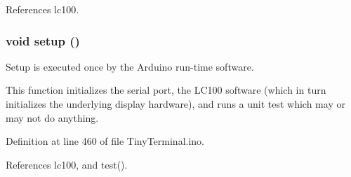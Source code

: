 References lc100.

\hypertarget{TinyTerminal_8ino_a4fc01d736fe50cf5b977f755b675f11d}{
\subsubsection[{setup}]{\setlength{\rightskip}{0pt plus 5cm}void setup ()}}
\label{TinyTerminal_8ino_a4fc01d736fe50cf5b977f755b675f11d}


Setup is executed once by the Arduino run-\/time software. 

This function initializes the serial port, the LC100 software (which in turn initializes the underlying display hardware), and runs a unit test which may or may not do anything. 

Definition at line 460 of file TinyTerminal.ino.



References lc100, and test().

